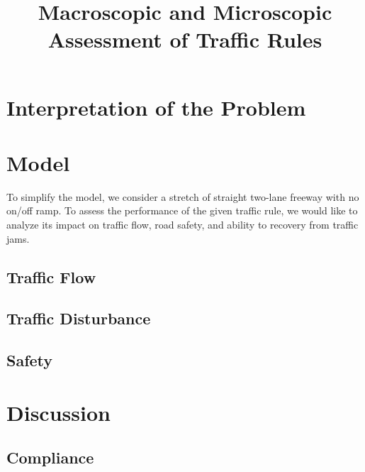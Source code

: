 \documentclass[aps,prl,superscriptaddress,12pt]{revtex4-1}
\begin{document}
	\title{Macroscopic and Microscopic Assessment of Traffic Rules}
		
	\begin{abstract}
	\singlespacing
		
	\end{abstract}
	
\maketitle

	\section{Interpretation of the Problem}


	\section{Model}
	To simplify the model, we consider a stretch of straight two-lane freeway with no on/off ramp. To assess the performance of the given traffic rule, we would like to analyze its impact on traffic flow, road safety, and ability to recovery from traffic jams.
		\subsection{Traffic Flow} 
		
	
		\subsection{Traffic Disturbance}
			
	
		\subsection{Safety}
		
	
	\section{Discussion}
		\subsection{Compliance}
		
		
\end{document}
